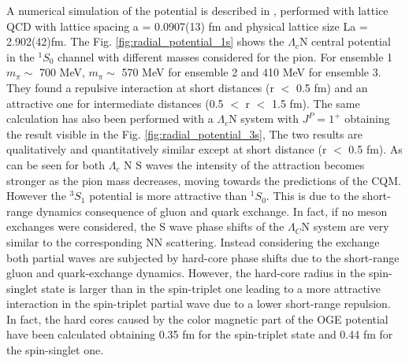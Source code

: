 \documentclass[12pt,a4paper]{book}
\begin{document}
	
	A numerical simulation of the potential is described in \cite{MIYAMOTO2018113}, performed with lattice QCD with lattice spacing a = 0.0907(13) fm and physical lattice size La = 2.902(42)fm. The Fig. \ref{fig:radial_potential_1s} shows the $\Lambda_c$N central potential in the $^{1}S_0$ channel with different masses considered for the pion. For ensemble 1 $m_\pi \sim$ 700 MeV, $m_\pi \sim$ 570 MeV for ensemble 2 and 410 MeV for ensemble 3. They found a repulsive interaction at short distances (r $<$ 0.5 fm) and an attractive one for intermediate distances (0.5 $<$ r $<$ 1.5 fm). The same calculation has also been performed with a $\Lambda_c$N system with $J^P=1^+$ obtaining the result visible in the Fig. \ref{fig:radial_potential_3s}, 
	The two results are qualitatively and quantitatively similar except at short distance (r $<$ 0.5 fm). As can be seen for both $\Lambda_c$ N S waves the intensity of the attraction becomes stronger as the pion mass decreases, moving towards the predictions of the CQM. However the $^{3}S_1$ potential is more attractive than $^{1}S_0$. This is due to the short-range dynamics consequence of gluon and quark exchange. In fact, if no meson exchanges were considered, the S wave phase shifts of the $\Lambda_C$N system are very similar to the corresponding NN scattering. Instead considering the exchange both partial waves are subjected by hard-core phase shifts due to the short-range gluon and quark-exchange dynamics. However, the hard-core radius in the spin-singlet state is larger than in the spin-triplet one leading to a more attractive interaction in the spin-triplet partial wave due to a lower short-range repulsion. In fact, the hard cores caused by the color magnetic part of the OGE potential have been calculated obtaining 0.35 fm for the spin-triplet state and 0.44 fm for the spin-singlet one.
	
\end{document}
